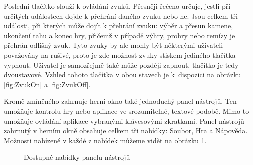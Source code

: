 Poslední tlačítko slouží k ovládání zvuků. Přesněji řečeno určuje, jestli při určitých událostech dojde k přehrání daného zvuku nebo ne. Jsou celkem tři události, při kterých může dojít k přehrání zvuku: výběr a přesun kamene, ukončení tahu a konec hry, přičemž v případě výhry, prohry nebo remízy je přehrán odlišný zvuk. Tyto zvuky by ale mohly být některými uživateli považovány na rušivé, proto je zde možnost zvuky stiskem jediného tlačítka vypnout. Uživatel je samozřejmě také může později zapnout, tlačítko je tedy dvoustavové. Vzhled tohoto tlačítka v obou stavech je k~dispozici na obrázku \ref{fig:ZvukOn} a \ref{fig:ZvukOff}.

Kromě zmíněného zahrnuje herní okno také jednoduchý panel nástrojů. Ten umožňuje kontrolu hry nebo aplikace ve srozumitelné, textové podobě. Mimo to umožňuje ovládání aplikace vybranými klávesovými zkratkami. Panel nástrojů zahrnutý v herním okně obsahuje celkem tři nabídky: \textsf{Soubor}, \textsf{Hra} a \textsf{Nápověda}. Možnosti nabízené v každé z nabídek můžeme vidět na obrázku \ref{fig:PanelNastroju}.

\begin{figure}
	\centering
	\hspace{3em} %
	\hspace{3em} %
	\caption{Dostupné nabídky panelu nástrojů}
	\label{fig:PanelNastroju}
\end{figure}

